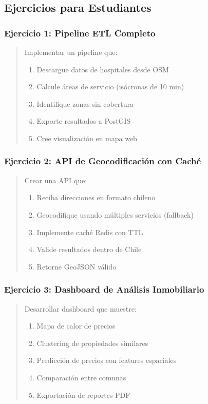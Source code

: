\documentclass[11pt,a4paper]{article}
\begin{document}
\subsection{Ejercicios para Estudiantes}

\subsubsection{Ejercicio 1: Pipeline ETL Completo}
\begin{quote}
Implementar un pipeline que:
\begin{enumerate}
    \item Descargue datos de hospitales desde OSM
    \item Calcule áreas de servicio (isócronas de 10 min)
    \item Identifique zonas sin cobertura
    \item Exporte resultados a PostGIS
    \item Cree visualización en mapa web
\end{enumerate}
\end{quote}

\subsubsection{Ejercicio 2: API de Geocodificación con Caché}
\begin{quote}
Crear una API que:
\begin{enumerate}
    \item Reciba direcciones en formato chileno
    \item Geocodifique usando múltiples servicios (fallback)
    \item Implemente caché Redis con TTL
    \item Valide resultados dentro de Chile
    \item Retorne GeoJSON válido
\end{enumerate}
\end{quote}

\subsubsection{Ejercicio 3: Dashboard de Análisis Inmobiliario}
\begin{quote}
Desarrollar dashboard que muestre:
\begin{enumerate}
    \item Mapa de calor de precios
    \item Clustering de propiedades similares
    \item Predicción de precios con features espaciales
    \item Comparación entre comunas
    \item Exportación de reportes PDF
\end{enumerate}
\end{quote}
\end{document}
